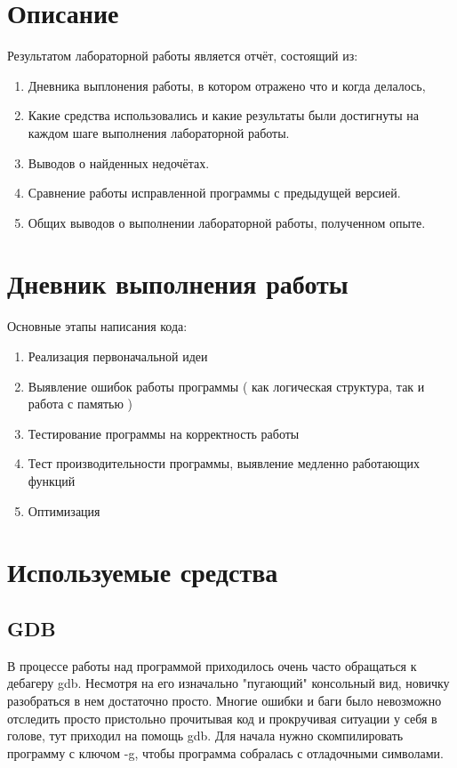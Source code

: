 \section{Описание}

Результатом лабораторной работы является отчёт, состоящий из:
\begin{enumerate}
\item{Дневника выплонения работы, в котором отражено что и когда делалось, }
\item{Какие средства использовались и какие результаты были достигнуты на каждом шаге выполнения лабораторной работы. }
\item{Выводов о найденных недочётах. }
\item{Сравнение работы исправленной программы с предыдущей версией. }
\item{Общих выводов о выполнении лабораторной работы, полученном опыте. }
\end{enumerate}


\section{Дневник выполнения работы}

Основные этапы написания кода:
\begin{enumerate}
\item Реализация первоначальной идеи 
\item Выявление ошибок работы программы ( как логическая структура, так и работа с памятью )
\item Тестирование программы на корректность работы
\item Тест производительности программы, выявление медленно работающих функций
\item Оптимизация
\end{enumerate}

\section{Используемые средства}

\subsection{GDB}

В процессе работы над программой приходилось очень часто обращаться к  дебагеру gdb. Несмотря на его изначально "пугающий" консольный вид, новичку разобраться в нем достаточно просто. Многие ошибки и баги было невозможно отследить просто пристольно прочитывая код и прокручивая ситуации у себя в голове, тут  приходил на помощь gdb.
Для начала нужно скомпилировать программу с ключом -g, чтобы программа собралась с отладочными символами.

